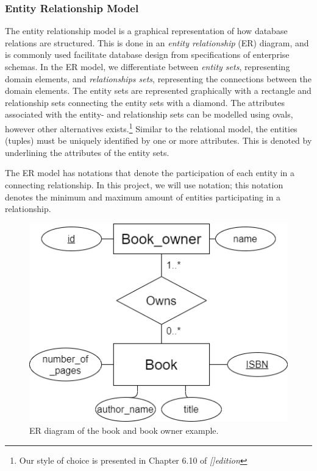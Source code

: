 \subsubsection{Entity Relationship Model}\label{sec:EntityRelationModel}
The entity relationship model is a graphical representation of how database relations are structured.
This is done in an \textit{entity relationship} (ER) diagram, and is commonly used facilitate database design from specifications of enterprise schemas\cite{DBSBook}.
In the ER model, we differentiate between \textit{entity sets}, representing domain elements, and \textit{relationships sets}, representing the connections between the domain elements. 
The entity sets are represented graphically with a rectangle and relationship sets connecting the entity sets with a diamond\cite{DBSBook}.
The attributes associated with the entity- and relationship sets can be modelled using ovals\cite{KatjaFirstPP}, however other alternatives exists.\footnote{Our style of choice is presented in Chapter 6.10 of  \textit{[]{edition}}}
Similar to the relational model, the entities (tuples) must be uniquely identified by one or more attributes. This is denoted by underlining the attributes of the entity sets. 

The ER model has notations that denote the participation of each entity in a connecting relationship\cite{DBSBook}.
In this project, we will use  notation; this notation denotes the minimum and maximum amount of entities participating in a relationship. 

\begin{figure}[htp]
    \centering
    \includegraphics[scale=0.5]{Images/book_example_w_cardinality.png}
    \caption{ER diagram of the book and book owner example.}
    \label{fig:ER_Book_Example}
\end{figure}

